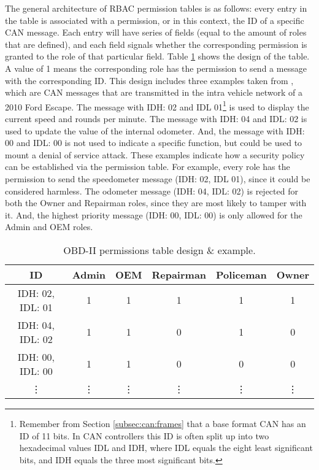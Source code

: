 The general architecture of RBAC permission tables is as follows: every entry in the table is associated with a permission, or in this context, the ID of a specific CAN message. Each entry will have series of fields (equal to the amount of roles that are defined), and each field signals whether the corresponding permission is granted to the role of that particular field. Table \ref{table:2} shows the design of the table. A value of 1 means the corresponding role has the permission to send a message with the corresponding ID. This design includes three examples taken from \cite{MillerC}, which are CAN messages that are transmitted in the intra vehicle network of a 2010 Ford Escape. The message with IDH: 02 and IDL 01\footnote{Remember from Section \ref{subsec:can:frames} that a base format CAN has an ID of 11 bits. In CAN controllers this ID is often split up into two hexadecimal values IDL and IDH, where IDL equals the eight least significant bits, and IDH equals the three most significant bits.} is used to display the current speed and rounds per minute. The message with IDH: 04 and IDL: 02 is used to update the value of the internal odometer. And, the message with IDH: 00 and IDL: 00 is not used to indicate a specific function, but could be used to mount a denial of service attack. These examples indicate how a security policy can be established via the permission table. For example, every role has the permission to send the speedometer message (IDH: 02, IDL 01), since it could be considered harmless. The odometer message (IDH: 04, IDL: 02) is rejected for both the Owner and Repairman roles, since they are most likely to tamper with it. And, the highest priority message (IDH: 00, IDL: 00) is only allowed for the Admin and OEM roles.

\begin{table}[]
	\begin{tabular}{|c|c|c|c|c|c|}
		\hline
		\rowcolor[HTML]{9B9B9B} ID & Admin & OEM & Repairman & Policeman & Owner \\ \hline
		\cellcolor[HTML]{9B9B9B} IDH: 02, IDL: 01 & 1 & 1 & 1 & 1 & 1 \\ \hline
		\cellcolor[HTML]{9B9B9B} IDH: 04, IDL: 02 & 1 & 1 & 0 & 1 & 0 \\ \hline
		\cellcolor[HTML]{9B9B9B} IDH: 00, IDL: 00 & 1 & 1 & 0 & 0 & 0 \\ \hline
		\cellcolor[HTML]{9B9B9B} \vdots & \vdots & \vdots & \vdots & \vdots & \vdots
	\end{tabular}
	\caption{OBD-II permissions table design \& example.}
	\label{table:2}
\end{table}

